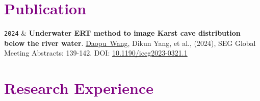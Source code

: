 \documentclass[10pt,a4paper]{article}
\newcommand{\FirstName}{Daopu}
\newcommand{\LastName}{Wang}
\newcommand{\Me}{\underline{\FirstName\  \LastName}}
\newcommand{\DikunYang}{Dikun Yang}
\newcommand{\Year}[1]{\fontsize{10pt}{0}\selectfont \texttt{#1}}
\begin{document}
\section{\textcolor{purple}{Publication}}

\begin{EntriesTableYear}
  \Year{2024} &
  \textbf{Underwater ERT method to image Karst cave distribution below the river water}.
  \newline
  \Me, \DikunYang, et al.,
  (2024), SEG Global Meeting Abstracts: 139-142. %
  DOI: \href{https://library.seg.org/doi/10.1190/iceg2023-032.1}{10.1190/iceg2023-0321.1}
  \\
\end{EntriesTableYear}

\section{\textcolor{purple}{Research Experience}}
\end{document}
